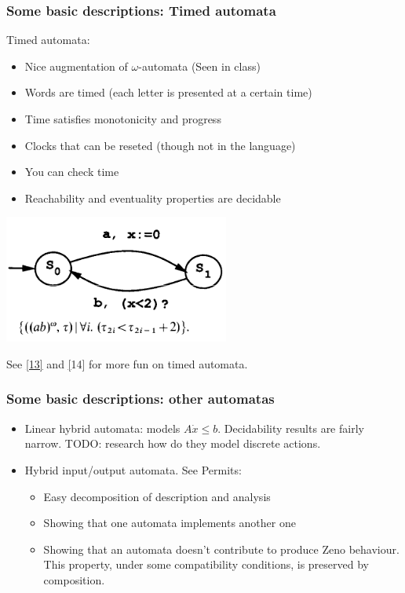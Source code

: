 \documentclass{beamer}
\begin{document}
\begin{frame}
	\frametitle{Some basic descriptions: Timed automata}
	Timed automata:
	\begin{itemize}
		\item Nice augmentation of $\omega$-automata (Seen in class)
		\item Words are timed (each letter is presented at a certain time)
		\item Time satisfies monotonicity and progress
		\item Clocks that can be reseted (though not in the language)
		\item You can check time
		\item Reachability and eventuality properties are decidable
	\end{itemize}
	
	\centerline{\includegraphics[scale=0.9]{timed_automata.png}}
	
	See \href{www.cis.upenn.edu/~alur/TCS94.pdf}{[13]} and \href{https://en.wikipedia.org/wiki/Timed_automaton}[14] for more fun on timed automata.
\end{frame}

\begin{frame}
	\frametitle{Some basic descriptions: other automatas}
	
	\begin{itemize}
		\item Linear hybrid automata: models $A\dot{x}\leq b$. Decidability results are fairly narrow. TODO: research how do they model discrete actions.
		\item Hybrid input/output automata. See
	Permits:
	\begin{itemize}
		\item Easy decomposition of description and analysis
		\item Showing that one automata implements another one
		\item Showing that an automata doesn't contribute to produce Zeno behaviour. This property, under some compatibility conditions, is preserved by composition.
	\end{itemize}
		
	\end{itemize}
\end{frame}
\end{document}
